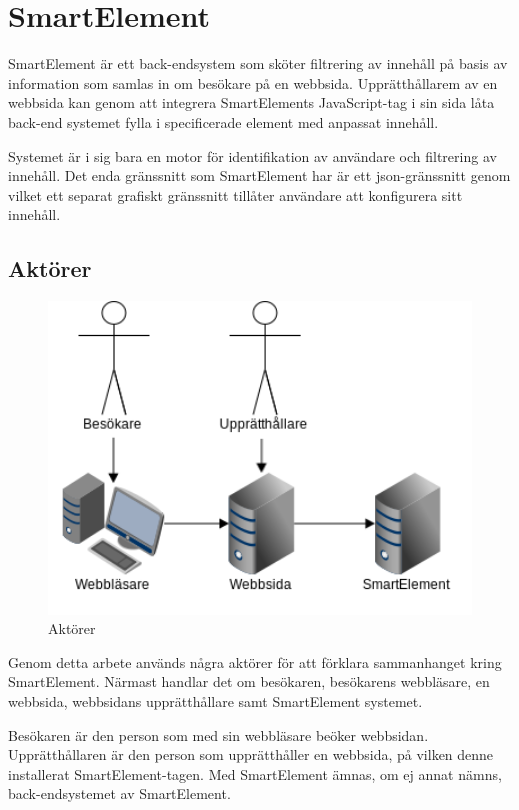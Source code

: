 \section{SmartElement}

SmartElement är ett back-endsystem som sköter filtrering av innehåll på basis av information som samlas in om besökare på en webbsida. Upprätthållarem av en webbsida kan genom att integrera SmartElements JavaScript-tag i sin sida låta back-end systemet fylla i specificerade element med anpassat innehåll.

Systemet är i sig bara en motor för identifikation av användare och filtrering av innehåll. Det enda gränssnitt som SmartElement har är ett \gls{json}-gränssnitt genom vilket ett separat grafiskt gränssnitt tillåter användare att konfigurera sitt innehåll.

\subsection{Aktörer}

\begin{figure}[h!]
\centering
\includegraphics[width=150mm]{assets/images/smeleactors.png}
\caption{Aktörer}
\label{actors}
\end{figure}

Genom detta arbete används några aktörer för att förklara sammanhanget kring SmartElement. Närmast handlar det om besökaren, besökarens webbläsare, en webbsida, webbsidans upprätthållare samt SmartElement systemet.

Besökaren är den person som med sin webbläsare beöker webbsidan. Upprätthållaren är den person som upprätthåller en webbsida, på vilken denne installerat SmartElement-tagen. Med SmartElement ämnas, om ej annat nämns, back-endsystemet av SmartElement.


